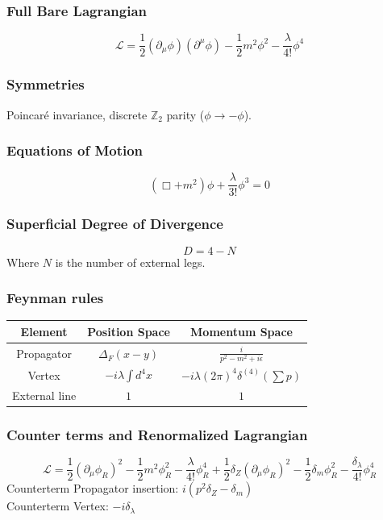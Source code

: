 \documentclass{article}
\begin{document}
\subsubsection*{Full Bare Lagrangian}
\begin{equation}
    \mathcal{L} = \frac{1}{2}(\partial_\mu \phi)(\partial^\mu \phi) - \frac{1}{2}m^2\phi^2 - \frac{\lambda}{4!}\phi^4
\end{equation}
\subsubsection*{Symmetries}
Poincar\'{e} invariance, discrete $\mathbb{Z}_2$ parity ($\phi \to -\phi$).
\subsubsection*{Equations of Motion}
\begin{equation}
    (\Box + m^2)\phi + \frac{\lambda}{3!}\phi^3 = 0
\end{equation}
\subsubsection*{Superficial Degree of Divergence}
\begin{equation}
    D = 4 - N
\end{equation}
Where $N$ is the number of external legs.
\subsubsection*{Feynman rules}
\begin{center}
\begin{tabular}{|c|c|c|}
\hline
\textbf{Element} & \textbf{Position Space} & \textbf{Momentum Space} \\ \hline
Propagator & $\Delta_F(x-y)$ & $\frac{i}{p^2 - m^2 + i\epsilon}$ \\ \hline
Vertex & $-i\lambda \int d^4x$ & $-i\lambda (2\pi)^4\delta^{(4)}(\sum p)$ \\ \hline
External line & $1$ & $1$ \\ \hline
\end{tabular}
\end{center}
\subsubsection*{Counter terms and Renormalized Lagrangian}
\begin{equation}
    \mathcal{L} = \frac{1}{2}(\partial_\mu \phi_R)^2 - \frac{1}{2}m^2\phi_R^2 - \frac{\lambda}{4!}\phi_R^4 + \frac{1}{2}\delta_Z (\partial_\mu \phi_R)^2 - \frac{1}{2}\delta_m \phi_R^2 - \frac{\delta_\lambda}{4!}\phi_R^4
\end{equation}
Counterterm Propagator insertion: $i(p^2 \delta_Z - \delta_m)$ \\
Counterterm Vertex: $-i\delta_\lambda$
\end{document}
